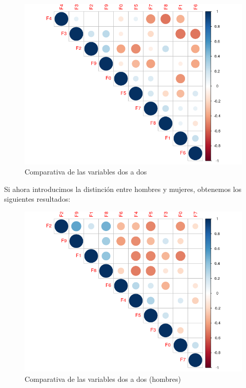\begin{figure}[H] %
	\centering
	\includegraphics[scale=0.75]{vowel-flatten.png}  %
	\caption{Comparativa de las variables dos a dos} 
	\label{fig:plot-vowel1}
\end{figure}
 
 \newpage
Si ahora introducimos la distinción entre hombres y mujeres, obtenemos los siguientes resultados:

\begin{figure}[H] %
	\centering
	\includegraphics[scale=0.75]{hombres-flatten.png}  %
	\caption{Comparativa de las variables dos a dos (hombres)} 
	\label{fig:hombres-vowel1}
\end{figure}

